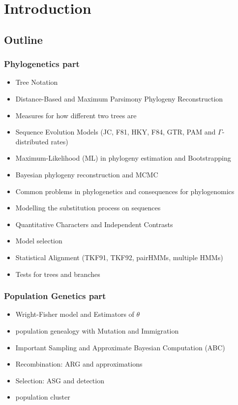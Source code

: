 \documentclass[12pt]{book}
\begin{document}
%  
\else
\fi

\setcounter{chapter}{-1}    %

\chapter{Introduction}
\section{Outline}
    \subsection{Phylogenetics part}
        \begin{itemize}
            \item Tree Notation
            \item Distance-Based and Maximum Parsimony Phylogeny Reconstruction
            \item Measures for how different two trees are
            \item Sequence Evolution Models (JC, F81, HKY, F84, GTR, PAM and $\Gamma$-distributed rates)
            \item Maximum-Likelihood (ML) in phylogeny estimation and Bootstrapping
            \item Bayesian phylogeny reconstruction and MCMC
            \item Common problems in phylogenetics and consequences for phylogenomics
            \item Modelling the substitution process on sequences
            \item Quantitative Characters and Independent Contrasts
            \item Model selection
            \item Statistical Alignment (TKF91, TKF92, pairHMMs, multiple HMMs)
            \item Tests for trees and branches
        \end{itemize}

    \subsection{Population Genetics part}
        \begin{itemize}
            \item Wright-Fisher model and Estimators of $\theta$
            \item population genealogy with Mutation and Immigration
            \item Important Sampling and Approximate Bayesian Computation (ABC)
            \item Recombination: ARG and approximations
            \item Selection: ASG and detection
            \item population cluster
        \end{itemize}
\end{document}
